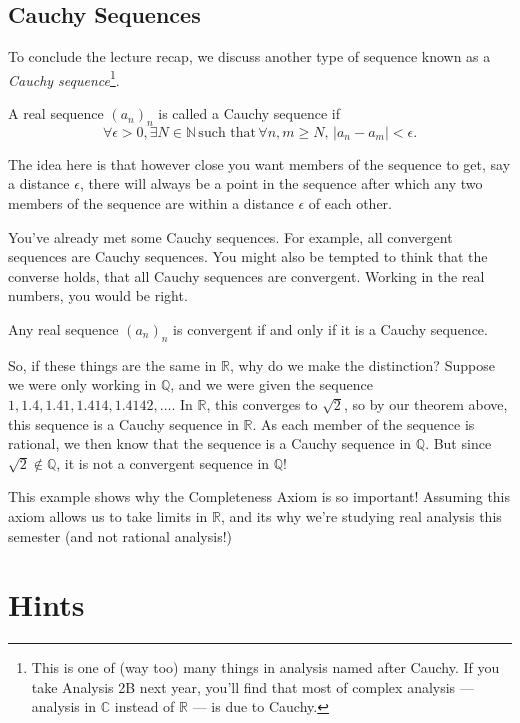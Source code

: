 \documentclass[
  12pt,
  a4paper]{extarticle}
\theoremstyle{plain}
\theoremstyle{plain}
\theoremstyle{plain}
\theoremstyle{plain}
\theoremstyle{plain}
\theoremstyle{definition}
\theoremstyle{definition}
\theoremstyle{definition}
\theoremstyle{remark}
\let\BeginKnitrBlock\begin \let\EndKnitrBlock\end
\renewcommand{\;}{\,}
\begin{document}
\hypertarget{cauchy-sequences}{%
\subsection{Cauchy Sequences}\label{cauchy-sequences}}

To conclude the lecture recap, we discuss another type of sequence known as a \emph{Cauchy sequence}\footnote{This is one of (way too) many things in analysis named after Cauchy. If you take Analysis 2B next year, you'll find that most of complex analysis --- analysis in \(\mathbb{C}\) instead of \(\mathbb{R}\) --- is due to Cauchy.}.

\BeginKnitrBlock{definition}[Cauchy Sequence]
{\label{def:def2} }A real sequence \((a_n)_n\) is called a Cauchy sequence if \[\forall \epsilon >0, \exists N \in \mathbb{N} \; \text{such that} \; \forall n,m \geq N, \; \lvert a_n - a_m\rvert < \epsilon.\]
\EndKnitrBlock{definition}
The idea here is that however close you want members of the sequence to get, say a distance \(\epsilon\), there will always be a point in the sequence after which any two members of the sequence are within a distance \(\epsilon\) of each other.

You've already met some Cauchy sequences. For example, all convergent sequences are Cauchy sequences. You might also be tempted to think that the converse holds, that all Cauchy sequences are convergent. Working in the real numbers, you would be right.

\BeginKnitrBlock{theorem}
{\label{thm:thm3} }Any real sequence \((a_n)_n\) is convergent if and only if it is a Cauchy sequence.
\EndKnitrBlock{theorem}
So, if these things are the same in \(\mathbb{R}\), why do we make the distinction? Suppose we were only working in \(\mathbb{Q}\), and we were given the sequence \(1,1.4,1.41,1.414,1.4142,\ldots\). In \(\mathbb{R}\), this converges to \(\sqrt{2}\), so by our theorem above, this sequence is a Cauchy sequence in \(\mathbb{R}\). As each member of the sequence is rational, we then know that the sequence is a Cauchy sequence in \(\mathbb{Q}\). But since \(\sqrt{2} \not\in \mathbb{Q}\), it is not a convergent sequence in \(\mathbb{Q}\)!

This example shows why the Completeness Axiom is so important! Assuming this axiom allows us to take limits in \(\mathbb{R}\), and its why we're studying real analysis this semester (and not rational analysis!)

\hypertarget{hints}{%
\section{Hints}\label{hints}}
\end{document}
